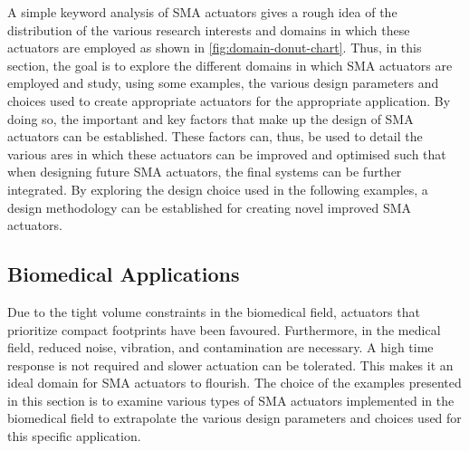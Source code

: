 A simple keyword analysis of SMA actuators gives a rough idea of the distribution of the various research interests and domains in which these actuators are employed as shown in \cref{fig:domain-donut-chart}. Thus, in this section, the goal is to explore the different domains in which SMA actuators are employed and study, using some examples, the various design parameters and choices used to create appropriate actuators for the appropriate application. By doing so, the important and key factors that make up the design of SMA actuators can be established. These factors can, thus, be used to detail the various ares in which these actuators can be improved and optimised such that when designing future SMA actuators, the final systems can be further integrated. By exploring the design choice used in the following examples, a design methodology can be established for creating novel improved SMA actuators.

\subsection{Biomedical Applications}
Due to the tight volume constraints in the biomedical field, actuators that prioritize compact footprints have been favoured. Furthermore, in the medical field, reduced noise, vibration, and contamination are necessary. A high time response is not required and slower actuation can be tolerated. This makes it an ideal domain for SMA actuators to flourish. The choice of the examples presented in this section is to examine various types of SMA actuators implemented in the biomedical field to extrapolate the various design parameters and choices used for this specific application.

